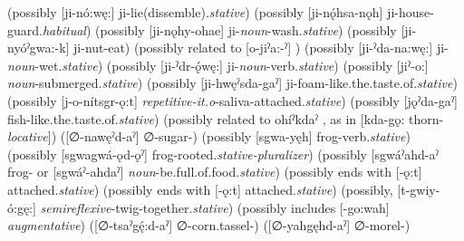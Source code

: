 \begin{multicols}{2}
  (possibly [ji-nó:wę:] ji-lie(dissemble).\textit{stative})
  (possibly [ji-nǫ́hsa-nǫh] ji-house-guard.\textit{habitual})
  (possibly [ji-nǫhy-ohae] ji-\textit{noun}-wash.\textit{stative})
  (possibly [ji-nyóˀgwa:-k] ji-nut-eat)
  (possibly related to [o-jiˀa:-ˀ] )
  (possibly [ji-ˀda-na:wę:] ji-\textit{noun}-wet.\textit{stative})
  (possibly [ji-ˀdr-ǫ́wę:] ji-\textit{noun}-verb.\textit{stative})
 
 
  (possibly [jiˀ-o:] \textit{noun}-submerged.\textit{stative})
 
 
  (possibly [ji-hwęˀsda-gaˀ] ji-foam-like.the.taste.of.\textit{stative})
  (possibly [j-o-nítsgr-ǫ:t] \textit{repetitive-it.o}-saliva-attached.\textit{stative})
 
  (possibly [jǫˀda-gaˀ] fish-like.the.taste.of.\textit{stative})
  (possibly related to ohíˀkdaˀ , as in [kda-gǫ: thorn-\textit{locative}])
 
  ([∅-nawęˀd-aˀ] ∅-sugar-\textit{\nsf})
 
 
 
  (possibly [sgwa-yęh] frog-verb.\textit{stative})
  (possibly [sgwagwá-ǫd-ǫˀ] frog-rooted.\textit{stative-pluralizer})
  (possibly [sgwáˀahd-aˀ frog-\textit{\nsf} or [sgwáˀ-ahdaˀ] \textit{noun}-be.full.of.food.\textit{stative})
 
  (possibly ends with [-ǫ:t] attached.\textit{stative})
  (possibly ends with [-ǫ:t] attached.\textit{stative})
 
 
  (possibly, [t-gwiy-ó:gę:] \textit{semireflexive}-twig-together.\textit{stative})
  (possibly includes [-go:wah] \textit{augmentative})
  ([∅-tsaˀgę́:d-aˀ] ∅-corn.tassel-\textit{\nsf})
 
  ([∅-yahgęhd-aˀ] ∅-morel-\textit{\nsf})

\end{multicols}

